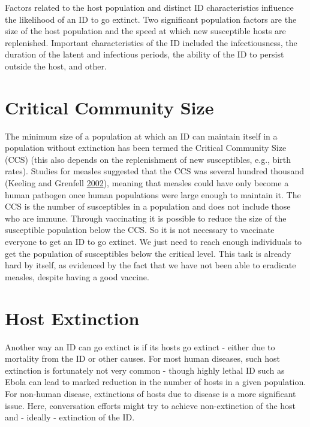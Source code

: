 \documentclass[]{book}
\theoremstyle{definition}
\theoremstyle{definition}
\theoremstyle{definition}
\theoremstyle{remark}
\begin{document}
Factors related to the host population and distinct ID characteristics
influence the likelihood of an ID to go extinct. Two significant
population factors are the size of the host population and the speed at
which new susceptible hosts are replenished. Important characteristics
of the ID included the infectiousness, the duration of the latent and
infectious periods, the ability of the ID to persist outside the host,
and other.

\hypertarget{critical-community-size}{%
\section{Critical Community Size}\label{critical-community-size}}

The minimum size of a population at which an ID can maintain itself in a
population without extinction has been termed the Critical Community
Size (CCS) (this also depends on the replenishment of new susceptibles,
e.g., birth rates). Studies for measles suggested that the CCS was
several hundred thousand (Keeling and Grenfell
\protect\hyperlink{ref-keeling02}{2002}), meaning that measles could
have only become a human pathogen once human populations were large
enough to maintain it. The CCS is the number of susceptibles in a
population and does not include those who are immune. Through
vaccinating it is possible to reduce the size of the susceptible
population below the CCS. So it is not necessary to vaccinate everyone
to get an ID to go extinct. We just need to reach enough individuals to
get the population of susceptibles below the critical level. This task
is already hard by itself, as evidenced by the fact that we have not
been able to eradicate measles, despite having a good vaccine.

\hypertarget{host-extinction}{%
\section{Host Extinction}\label{host-extinction}}

Another way an ID can go extinct is if its hosts go extinct - either due
to mortality from the ID or other causes. For most human diseases, such
host extinction is fortunately not very common - though highly lethal ID
such as Ebola can lead to marked reduction in the number of hosts in a
given population. For non-human disease, extinctions of hosts due to
disease is a more significant issue. Here, conversation efforts might
try to achieve non-extinction of the host and - ideally - extinction of
the ID.
\end{document}

